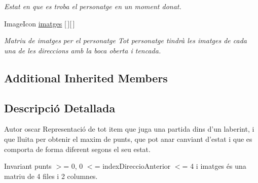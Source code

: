 \begin{DoxyCompactItemize}
\begin{DoxyCompactList}\small\item\em Estat en que es troba el personatge en un moment donat. \end{DoxyCompactList}\item 
\hypertarget{classlogica_1_1_personatge_a066a8096f86141bc7a7400cca4c18a7b}{Image\+Icon \hyperlink{classlogica_1_1_personatge_a066a8096f86141bc7a7400cca4c18a7b}{imatges} \mbox{[}$\,$\mbox{]}\mbox{[}$\,$\mbox{]}}\label{classlogica_1_1_personatge_a066a8096f86141bc7a7400cca4c18a7b}

\begin{DoxyCompactList}\small\item\em Matriu de imatges per el personatge Tot personatge tindrà les imatges de cada una de les direccions amb la boca oberta i tencada. \end{DoxyCompactList}\end{DoxyCompactItemize}
\subsection*{Additional Inherited Members}


\subsection{Descripció Detallada}
\begin{DoxyAuthor}{Autor}
oscar  Representació de tot item que juga una partida dins d'un laberint, i que lluita per obtenir el maxim de punts, que pot anar canviant d'estat i que es comporta de forma diferent segons el seu estat.
\end{DoxyAuthor}
\begin{DoxyInvariant}{Invariant}
punts $>$= 0, 0 $<$= index\+Direccio\+Anterior $<$= 4 i imatges és una matriu de 4 files i 2 columnes. 
\end{DoxyInvariant}


